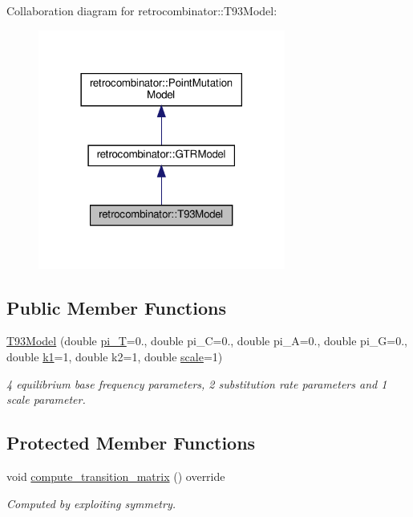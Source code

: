 Collaboration diagram for retrocombinator\+:\+:T93\+Model\+:
\nopagebreak
\begin{figure}[H]
\begin{center}
\leavevmode
\includegraphics[width=230pt]{classretrocombinator_1_1T93Model__coll__graph}
\end{center}
\end{figure}
\subsection*{Public Member Functions}
\begin{DoxyCompactItemize}
\item 
\hyperlink{classretrocombinator_1_1T93Model_ad857daf369e1d16fc8233b08dc0deef8}{T93\+Model} (double \hyperlink{classretrocombinator_1_1GTRModel_ab002dbc62f8e8fbfc94558dd94166bd8}{pi\+\_\+T}=0., double pi\+\_\+C=0., double pi\+\_\+A=0., double pi\+\_\+G=0., double \hyperlink{classretrocombinator_1_1T93Model_a6844211aebb1deb555fa6f9b11b9d395}{k1}=1, double k2=1, double \hyperlink{classretrocombinator_1_1PointMutationModel_a3258dfbdae0f2614cdc66f13ae028b46}{scale}=1)
\begin{DoxyCompactList}\small\item\em 4 equilibrium base frequency parameters, 2 substitution rate parameters and 1 scale parameter. \end{DoxyCompactList}\end{DoxyCompactItemize}
\subsection*{Protected Member Functions}
\begin{DoxyCompactItemize}
\item 
\mbox{\label{classretrocombinator_1_1T93Model_aaa8c96927a1ff3b8c611f0d0f9d6f36a}} 
void \hyperlink{classretrocombinator_1_1T93Model_aaa8c96927a1ff3b8c611f0d0f9d6f36a}{compute\+\_\+transition\+\_\+matrix} () override
\begin{DoxyCompactList}\small\item\em Computed by exploiting symmetry. \end{DoxyCompactList}\end{DoxyCompactItemize}
